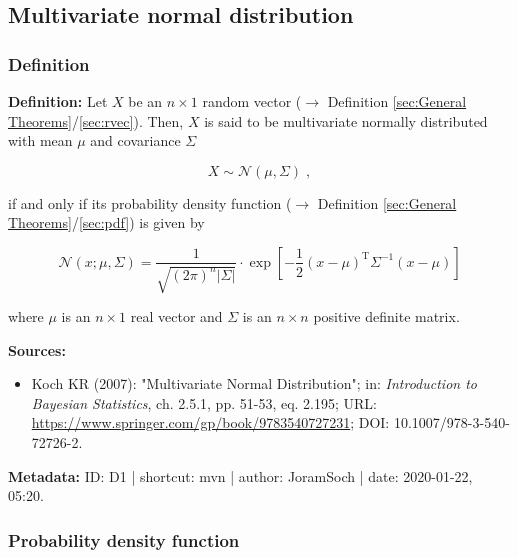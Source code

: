 \documentclass[a4paper,12pt,twoside]{book}
\begin{document}
\subsection{Multivariate normal distribution}

\subsubsection[\textit{Definition}]{Definition} \label{sec:mvn}
\setcounter{equation}{0}

\textbf{Definition:} Let $X$ be an $n \times 1$ random vector ($\rightarrow$ Definition \ref{sec:General Theorems}/\ref{sec:rvec}). Then, $X$ is said to be multivariate normally distributed with mean $\mu$ and covariance $\Sigma$

\begin{equation} \label{eq:mvn-mvn}
X \sim \mathcal{N}(\mu, \Sigma) \; ,
\end{equation}

if and only if its probability density function ($\rightarrow$ Definition \ref{sec:General Theorems}/\ref{sec:pdf}) is given by

\begin{equation} \label{eq:mvn-mvn-pdf}
\mathcal{N}(x; \mu, \Sigma) = \frac{1}{\sqrt{(2 \pi)^n |\Sigma|}} \cdot \exp \left[ -\frac{1}{2} (x-\mu)^\mathrm{T} \Sigma^{-1} (x-\mu) \right]
\end{equation}

where $\mu$ is an $n \times 1$ real vector and $\Sigma$ is an $n \times n$ positive definite matrix.


\vspace{1em}
\textbf{Sources:}
\begin{itemize}
\item Koch KR (2007): "Multivariate Normal Distribution"; in: \textit{Introduction to Bayesian Statistics}, ch. 2.5.1, pp. 51-53, eq. 2.195; URL: \url{https://www.springer.com/gp/book/9783540727231}; DOI: 10.1007/978-3-540-72726-2.
\end{itemize}


\vspace{1em}
\textbf{Metadata:} ID: D1 | shortcut: mvn | author: JoramSoch | date: 2020-01-22, 05:20.
\vspace{1em}



\subsubsection[\textbf{Probability density function}]{Probability density function} \label{sec:mvn-pdf}
\setcounter{equation}{0}
\end{document}
